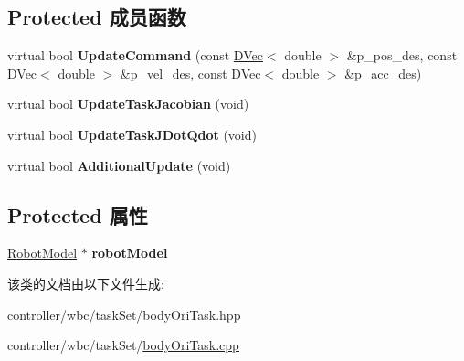 \subsection*{Protected 成员函数}
\begin{DoxyCompactItemize}
\item 
\mbox{\label{classquadruped_1_1BodyOriTask_a7f75d27666eaae52bb5b2a9a1ac7b8f3}} 
virtual bool {\bfseries Update\+Command} (const \hyperlink{cppTypes_8h_adad69baca3c77d5f991be5d3c063fea7}{D\+Vec}$<$ double $>$ \&p\+\_\+pos\+\_\+des, const \hyperlink{cppTypes_8h_adad69baca3c77d5f991be5d3c063fea7}{D\+Vec}$<$ double $>$ \&p\+\_\+vel\+\_\+des, const \hyperlink{cppTypes_8h_adad69baca3c77d5f991be5d3c063fea7}{D\+Vec}$<$ double $>$ \&p\+\_\+acc\+\_\+des)
\item 
\mbox{\label{classquadruped_1_1BodyOriTask_a8e586844e192c0dadafc4f9f2157bb86}} 
virtual bool {\bfseries Update\+Task\+Jacobian} (void)
\item 
\mbox{\label{classquadruped_1_1BodyOriTask_a9697740e61b011bfe7847840e1dce00e}} 
virtual bool {\bfseries Update\+Task\+J\+Dot\+Qdot} (void)
\item 
\mbox{\label{classquadruped_1_1BodyOriTask_a810528aef22f9c6ba0949e35e1fcf397}} 
virtual bool {\bfseries Additional\+Update} (void)
\end{DoxyCompactItemize}
\subsection*{Protected 属性}
\begin{DoxyCompactItemize}
\item 
\mbox{\label{classquadruped_1_1BodyOriTask_ac7a9a5bd9b8239af3cb68e49d0a1b0a0}} 
\hyperlink{classquadruped_1_1RobotModel}{Robot\+Model} $\ast$ {\bfseries robot\+Model}
\end{DoxyCompactItemize}


该类的文档由以下文件生成\+:\begin{DoxyCompactItemize}
\item 
controller/wbc/task\+Set/body\+Ori\+Task.\+hpp\item 
controller/wbc/task\+Set/\hyperlink{bodyOriTask_8cpp}{body\+Ori\+Task.\+cpp}\end{DoxyCompactItemize}

